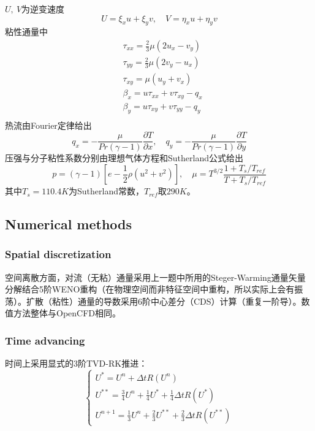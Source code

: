\documentclass[11pt]{article}
\begin{document}
$U,\ V$为逆变速度
\begin{equation}
	U=\xi_x u+\xi_y v,\quad V=\eta_x u+\eta_y v
\end{equation}
粘性通量中
\begin{align}
	 & \tau_{xx}=\frac{2}{3}\mu\left(2u_x-v_y\right) \\
	 & \tau_{yy}=\frac{2}{3}\mu\left(2v_y-u_x\right) \\
	 & \tau_{xy}=\mu\left(u_y+v_x\right)             \\
	 & \beta_x=u\tau_{xx}+v\tau_{xy}-q_x             \\
	 & \beta_y=u\tau_{xy}+v\tau_{yy}-q_y             \\
\end{align}
热流由Fourier定律给出
\begin{equation}
	q_x=-\frac{\mu}{Pr(\gamma-1)}\frac{\partial T}{\partial x},\quad q_y=-\frac{\mu}{Pr(\gamma-1)}\frac{\partial T}{\partial y}
\end{equation}
压强与分子粘性系数分别由理想气体方程和Sutherland公式给出
\begin{equation}
	p=(\gamma-1)\left[e-\frac{1}{2}\rho\left(u^2+v^2\right)\right],\quad \mu=T^{3/2}\frac{1+T_s/T_{ref}}{T+T_s/T_{ref}}
\end{equation}
其中$T_s=110.4K$为Sutherland常数，$T_{ref}$取$290K$。

\subsection{Numerical methods}
\subsubsection{Spatial discretization}
空间离散方面，对流（无粘）通量采用上一题中所用的Steger-Warming通量矢量分解结合5阶WENO重构（在物理空间而非特征空间中重构，所以实际上会有振荡）。扩散（粘性）通量的导数采用6阶中心差分（CDS）计算（重复一阶导）。数值方法整体与OpenCFD相同。

\subsubsection{Time advancing}
时间上采用显式的3阶TVD-RK推进：
\begin{equation}
	\left\{\begin{array}{l}
		U^*=U^n+\Delta t R(U^n)                                         \\
		U^{**}=\frac{3}{4}U^n+\frac{1}{4}U^*+\frac{1}{4}\Delta t R(U^*) \\
		U^{n+1}=\frac{1}{3}U^n+\frac{2}{3}U^{**}+\frac{2}{3}\Delta t R(U^{**})
	\end{array}\right.
\end{equation}
\end{document}
